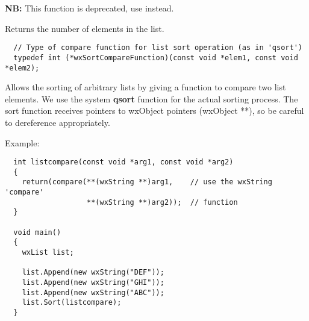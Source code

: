 \label{wxlistnumber}


{\bf NB:} This function is deprecated, use  instead.

Returns the number of elements in the list.

\label{wxlistsort}


\begin{verbatim}
  // Type of compare function for list sort operation (as in 'qsort')
  typedef int (*wxSortCompareFunction)(const void *elem1, const void *elem2);
\end{verbatim}

Allows the sorting of arbitrary lists by giving
a function to compare two list elements. We use the system {\bf qsort} function
for the actual sorting process. The sort function receives pointers to wxObject pointers (wxObject **),
so be careful to dereference appropriately.

Example:

\begin{verbatim}
  int listcompare(const void *arg1, const void *arg2)
  {
    return(compare(**(wxString **)arg1,    // use the wxString 'compare'
                   **(wxString **)arg2));  // function 
  }

  void main()
  {
    wxList list;

    list.Append(new wxString("DEF"));
    list.Append(new wxString("GHI"));
    list.Append(new wxString("ABC"));
    list.Sort(listcompare);
  }
\end{verbatim}

